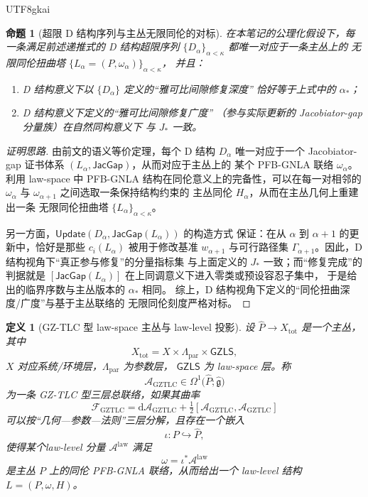 \documentclass[12pt]{article}
\newtheorem{definition}{定义}[section]
\newtheorem{proposition}{命题}[section]
\newcommand{\JacGap}{\mathsf{JacGap}}
\begin{document}
\begin{CJK*}{UTF8}{gkai}
\begin{proposition}[超限 D 结构序列与主丛无限同伦的对标]
在本笔记的公理化假设下，每一条满足前述递推式的 D 结构超限序列
  $\{D_\alpha\}_{\alpha<\kappa}$ 都唯一对应于一条主丛上的
  无限同伦扭曲塔 $\{L_\alpha=(P,\omega_\alpha)\}_{\alpha<\kappa}$，
  并且：
  \begin{enumerate}
    \item D 结构意义下以 $\{D_\alpha\}$ 定义的“雅可比间隙修复深度”
          恰好等于上式中的 $\alpha_\ast$；
    \item D 结构意义下定义的“雅可比间隙修复广度”
          （参与实际更新的 Jacobiator-gap 分量族）在自然同构意义下
          与 $J_\ast$ 一致。
  \end{enumerate}
\end{proposition}

\begin{proof}[证明思路]
由前文的语义等价定理，每个 D 结构 $D_\alpha$ 唯一对应于一个
Jacobiator-gap 证书体系 $(L_\alpha,\JacGap)$，从而对应于主丛上的
某个 PFB-GNLA 联络 $\omega_\alpha$。利用 law-space 中
PFB-GNLA 结构在同伦意义上的完备性，可以在每一对相邻的
$\omega_\alpha$ 与 $\omega_{\alpha+1}$ 之间选取一条保持结构约束的
主丛同伦 $H_\alpha$，从而在主丛几何上重建出一条
无限同伦扭曲塔 $\{L_\alpha\}_{\alpha<\kappa}$。

另一方面，$\mathsf{Update}(D_\alpha,\JacGap(L_\alpha))$ 的构造方式
保证：在从 $\alpha$ 到 $\alpha+1$ 的更新中，恰好是那些
$c_i(L_\alpha)$ 被用于修改基准 $w_{\alpha+1}$ 与可行路径集
$\Gamma_{\alpha+1}$。因此，D 结构视角下“真正参与修复”的分量指标集
与上面定义的 $J_\ast$ 一致；而“修复完成”的判据就是
$[\JacGap(L_\alpha)]$ 在上同调意义下进入零类或预设容忍子集中，
于是给出的临界序数与主丛版本的 $\alpha_\ast$ 相同。
综上，D 结构视角下定义的“同伦扭曲深度/广度”与基于主丛联络的
无限同伦刻度严格对标。
\end{proof}

\begin{definition}[GZ-TLC 型 law-space 主丛与 law-level 投影]
设 $\widehat{P}\to X_{\mathrm{tot}}$ 是一个主丛，其中
\[
  X_{\mathrm{tot}}
  =
  X\times\Lambda_{\mathrm{par}}\times\mathsf{GZLS},
\]
$X$ 对应系统/环境层，$\Lambda_{\mathrm{par}}$ 为参数层，
$\mathsf{GZLS}$ 为 law-space 层。称
\[
  \mathcal{A}_{\mathrm{GZTLC}}
  \in
  \Omega^1\bigl(\widehat{P};\widehat{\mathfrak g}\bigr)
\]
为一条 GZ-TLC 型三层总联络，如果其曲率
  \[
    \mathcal{F}_{\mathrm{GZTLC}}
    =
    \mathrm{d}\mathcal{A}_{\mathrm{GZTLC}}
    + \tfrac{1}{2}
      [\mathcal{A}_{\mathrm{GZTLC}},\mathcal{A}_{\mathrm{GZTLC}}]
  \]
可以按“几何—参数—法则”三层分解，且存在一个嵌入
\[
  \iota:P\hookrightarrow\widehat{P},
\]
使得某个\emph{law-level 分量} $\mathcal{A}^{\mathrm{law}}$ 满足
  \[
    \omega
    =
    \iota^\ast\mathcal{A}^{\mathrm{law}}
  \]
是主丛 $P$ 上的同伦 PFB-GNLA 联络，从而给出一个 law-level 结构
$L=(P,\omega,H)$。
\end{definition}


\end{CJK*}
\end{document}
